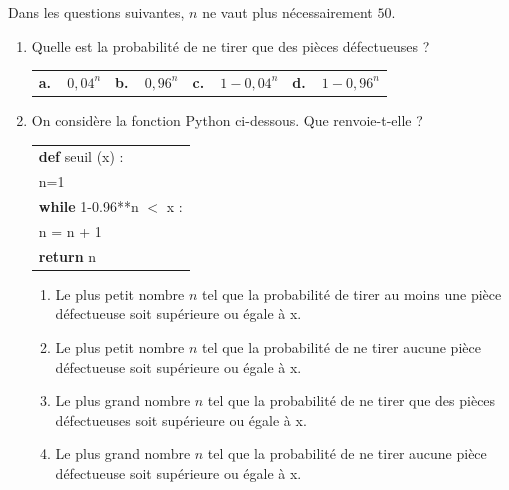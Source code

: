 Dans les questions suivantes, $n$ ne vaut plus nécessairement $50$.

\begin{enumerate}[resume]
\item Quelle est la probabilité de ne tirer que des pièces défectueuses ?

\begin{center}
\begin{tabularx}{\linewidth}{*{4}X}
\textbf{a.~~}$0,04^n$&\textbf{b.~~}$0,96^n$&\textbf{c.~~}$1 - 0,04^n$ &\textbf{d.~~}$1 - 0,96^n$
\end{tabularx}
\end{center}

\item On considère la fonction Python ci-dessous. Que renvoie-t-elle ?

\begin{center}
\begin{tabularx}{0.4\linewidth}{|X|}\hline
\textbf{def} seuil (x) :\\
\qquad n=1\\
\qquad \textbf{while} 1-0.96**n $<$ x :\\
\qquad \quad  n = n + 1\\
\qquad \textbf{return} n\\ \hline
\end{tabularx}
\end{center}

	\begin{enumerate}
		\item Le plus petit nombre $n$ tel que la probabilité de tirer au moins une pièce défectueuse soit supérieure ou égale à x.
		\item Le plus petit nombre $n$ tel que la probabilité de ne tirer aucune pièce défectueuse soit supérieure ou égale à x.
		\item Le plus grand nombre $n$ tel que la probabilité de ne tirer que des pièces défectueuses soit supérieure ou égale à x.
		\item Le plus grand nombre $n$ tel que la probabilité de ne tirer aucune pièce défectueuse soit supérieure ou égale à x.
	\end{enumerate}
\end{enumerate}
